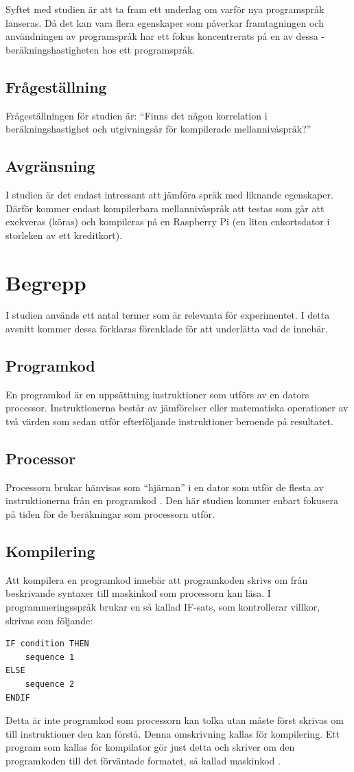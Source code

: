 \documentclass[12pt,swedish]{article}
\begin{document}
Syftet med studien är att ta fram ett underlag om varför nya programspråk lanseras. Då det kan vara flera egenskaper som påverkar framtagningen och användningen av programspråk har ett fokus koncentrerats på en av dessa - beräkningshastigheten hos ett programspråk.

\subsection{Frågeställning}
Frågeställningen för studien är: “Finns det någon korrelation i beräkningshastighet och utgivningsår för kompilerade mellannivåspråk?”

\subsection{Avgränsning}
I studien är det endast intressant att jämföra språk med liknande egenskaper. Därför kommer endast kompilerbara mellannivåspråk att testas som går att exekveras (köras) och kompileras på en Raspberry Pi (en liten enkortsdator i storleken av ett kreditkort).


\section{Begrepp}
I studien används ett antal termer som är relevanta för experimentet. I detta avsnitt kommer dessa förklaras förenklade för att underlätta vad de innebär.

\subsection{Programkod}
En programkod är en uppsättning instruktioner som utförs av en dators processor. Instruktionerna består av jämförelser eller matematiska operationer av två värden som sedan utför efterföljande instruktioner beroende på resultatet.

\subsection{Processor}
Processorn brukar hänvisas som “hjärnan” i en dator som utför de flesta av instruktionerna från en programkod \citep{charuba_1996}. Den här studien kommer enbart fokusera på tiden för de beräkningar som processorn utför.

\subsection{Kompilering}
Att kompilera en programkod innebär att programkoden skrivs om från beskrivande syntaxer till maskinkod som processorn kan läsa. I programmeringsspråk brukar en så kallad IF-sats, som kontrollerar villkor, skrivas som följande:
\begin{lstlisting}
IF condition THEN
    sequence 1
ELSE
    sequence 2
ENDIF
\end{lstlisting}
Detta är inte programkod som processorn kan tolka utan måste först skrivas om till instruktioner den kan förstå. Denna omskrivning kallas för kompilering. Ett program som kallas för kompilator gör just detta och skriver om den programkoden till det förväntade formatet, så kallad maskinkod \citep{srikant_shankar_2008}.
\end{document}
